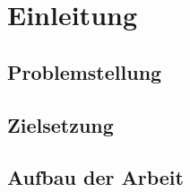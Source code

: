 \documentclass[../../main.tex]{subfiles}
\begin{document}
\section{Einleitung}
\subsection{Problemstellung}
\subsection{Zielsetzung}
\subsection{Aufbau der Arbeit}
\end{document}
